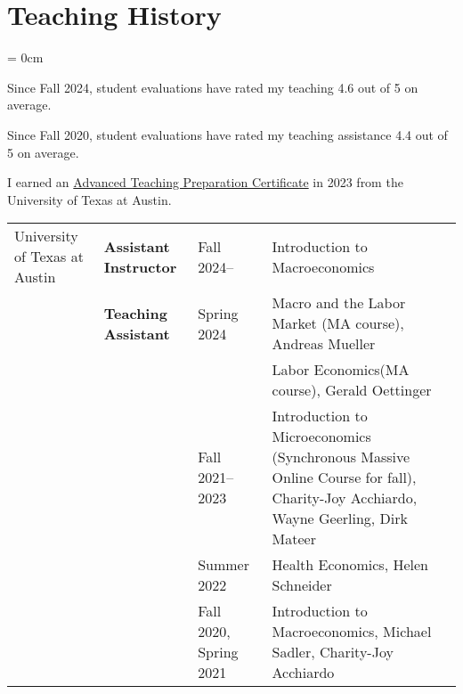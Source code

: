 \documentclass[a4paper, 10pt]{article}
\begin{document}
  \section{Teaching History}\label{sec:teaching_history}
  \begin{compactitem}\parskip = 0cm
    \item Since Fall 2024, student evaluations have rated my teaching 4.6 out of 5 on average.
    \item Since Fall 2020, student evaluations have rated my teaching assistance 4.4 out of 5 on average.
    \item I earned an \href{https://ctl.utexas.edu/teaching-preparation-series}{Advanced Teaching Preparation Certificate} in 2023 from the University of Texas at Austin.
  \end{compactitem}
  \vspace{1em}
  \begin{tabular}{p{2.3cm} p{3.1cm} p{2.3cm} p{6.4cm}}
    University of \newline Texas at Austin & \textbf{Assistant Instructor} & Fall 2024-- & Introduction to Macroeconomics\\
    & \textbf{Teaching Assistant} & Spring 2024 & Macro and the Labor Market \newline (MA course), Andreas Mueller\\
    & & & Labor Economics\newline (MA course), Gerald Oettinger\\
    & & Fall 2021--2023 & Introduction to Microeconomics \newline (Synchronous Massive Online Course \newline for fall), Charity-Joy Acchiardo, \newline Wayne Geerling, Dirk Mateer\\
    & & Summer 2022 & Health Economics, Helen Schneider\\
    & & Fall 2020, \newline Spring 2021 & Introduction to Macroeconomics, \newline Michael Sadler, Charity-Joy Acchiardo
  \end{tabular}
\end{document}
